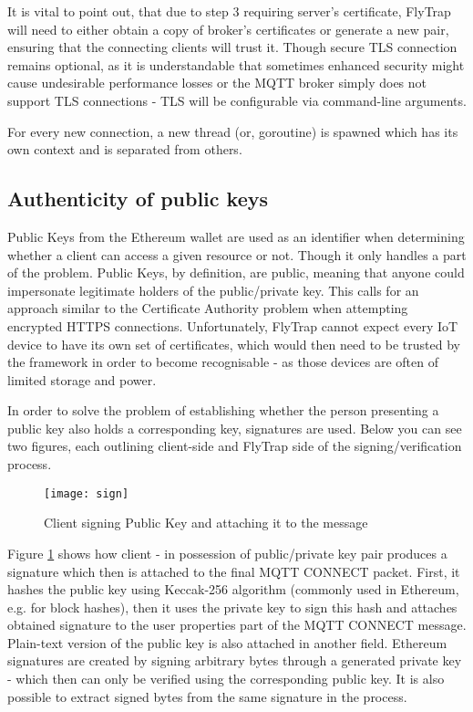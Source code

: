It is vital to point out, that due to step 3 requiring server's certificate, FlyTrap will need to either obtain a copy of broker's certificates or generate a new pair, ensuring that the connecting clients will trust it. Though secure TLS connection remains optional, as it is understandable that sometimes enhanced security might cause undesirable performance losses or the MQTT broker simply does not support TLS connections - TLS will be configurable via command-line arguments.

For every new connection, a new thread (or, goroutine) is spawned which has its own context and is separated from others.

\subsection{Authenticity of public keys}
Public Keys from the Ethereum wallet are used as an identifier when determining whether a client can access a given resource or not. Though it only handles a part of the problem. Public Keys, by definition, are public, meaning that anyone could impersonate legitimate holders of the public/private key. This calls for an approach similar to the Certificate Authority problem when attempting encrypted HTTPS connections. Unfortunately, FlyTrap cannot expect every IoT device to have its own set of certificates, which would then need to be trusted by the framework in order to become recognisable - as those devices are often of limited storage and power.

In order to solve the problem of establishing whether the person presenting a public key also holds a corresponding key, signatures are used. Below you can see two figures, each outlining client-side and FlyTrap side of the signing/verification process.

\begin{figure}[h]
    \centering
    \texttt{[image: sign]}
    \caption{Client signing Public Key and attaching it to the message}
    \label{fig:sign}
\end{figure}

Figure \ref{fig:sign} shows how client - in possession of public/private key pair produces a signature which then is attached to the final MQTT CONNECT packet. First, it hashes the public key using Keccak-256 algorithm \cite{bertoni2009keccak} (commonly used in Ethereum, e.g. for block hashes), then it uses the private key to sign this hash and attaches obtained signature to the user properties part of the MQTT CONNECT message. Plain-text version of the public key is also attached in another field. Ethereum signatures are created by signing arbitrary bytes through a generated private key - which then can only be verified using the corresponding public key. It is also possible to extract signed bytes from the same signature in the process.

